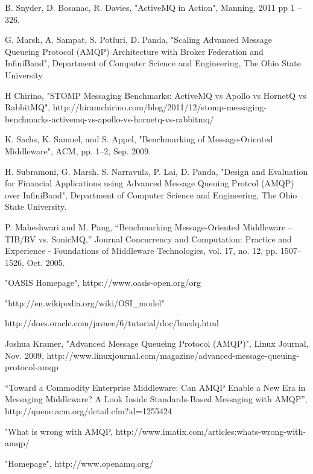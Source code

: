 \documentclass{thesis}
\begin{document}
\begin{singlespace}
\begin{thebibliography}{99}

 B. Snyder, D. Bosanac, R. Davies, "ActiveMQ in Action", Manning, 2011 pp 1 – 326.

 G. Marsh, A. Sampat, S. Potluri, D. Panda, "Scaling Advanced Message Queueing Protocol (AMQP) Architecture with Broker Federation and InfiniBand", Department of Computer Science and Engineering, The Ohio State University

 H Chirino, "STOMP Messaging Benchmarks: ActiveMQ vs Apollo vs HornetQ vs RabbitMQ", http://hiramchirino.com/blog/2011/12/stomp-messaging-benchmarks-activemq-vs-apollo-vs-hornetq-vs-rabbitmq/

 K. Sachs, K. Samuel, and S. Appel, "Benchmarking of Message-Oriented Middleware", ACM, pp. 1–2, Sep. 2009.

 H. Subramoni, G. Marsh, S. Narravula, P. Lai, D. Panda, "Design and Evaluation for Financial Applications using Advanced Message Queuing Protcol (AMQP) over InfiniBand", Department of Computer Science and Engineering, The Ohio State University.

 P. Maheshwari and M. Pang, “Benchmarking Message-Oriented Middleware – TIB/RV vs. SonicMQ,” Journal Concurrency and Computation: Practice and Experience - Foundations of Middleware Technologies, vol. 17, no. 12, pp. 1507–1526, Oct. 2005.

 "OASIS Homepage", https://www.oasis-open.org/org

 "http://en.wikipedia.org/wiki/OSI\_model"

 http://docs.oracle.com/javaee/6/tutorial/doc/bncdq.html

 Joshua Kramer, "Advanced Message Queueing Protocol (AMQP)", Linux Journal, Nov. 2009, http://www.linuxjournal.com/magazine/advanced-message-queuing-protocol-amqp

 “Toward a Commodity Enterprise Middleware: Can AMQP Enable a New Era in Messaging Middleware? A Look Inside Standards-Based Messaging with AMQP”, http://queue.acm.org/detail.cfm?id=1255424

 "What is wrong with AMQP, http://www.imatix.com/articles:whats-wrong-with-amqp/

 "Homepage", http://www.openamq.org/


\end{thebibliography}
\end{singlespace}
\end{document}
